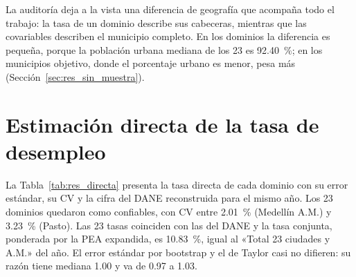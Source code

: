 La auditoría deja a la vista una diferencia de geografía que acompaña todo el trabajo: la tasa de un dominio describe sus cabeceras, mientras que las covariables describen el municipio completo. En los dominios la diferencia es pequeña, porque la población urbana mediana de los 23 es 92.40~\%; en los municipios objetivo, donde el porcentaje urbano es menor, pesa más (Sección~\ref{sec:res_sin_muestra}).

\section{Estimación directa de la tasa de desempleo}
\label{sec:res_directa}

La Tabla~\ref{tab:res_directa} presenta la tasa directa de cada dominio con su error estándar, su CV y la cifra del DANE reconstruida para el mismo año. Los 23 dominios quedaron como confiables, con CV entre 2.01~\% (Medellín A.M.) y 3.23~\% (Pasto). Las 23 tasas coinciden con las del DANE y la tasa conjunta, ponderada por la PEA expandida, es 10.83~\%, igual al «Total 23 ciudades y A.M.» del año. El error estándar por bootstrap y el de Taylor casi no difieren: su razón tiene mediana 1.00 y va de 0.97 a 1.03.


